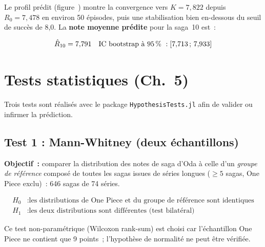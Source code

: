 \documentclass[a4paper,12pt,french]{article}
\newcommand{\code}[1]{\texttt{#1}}
\begin{document}
Le profil prédit (figure~) montre la convergence vers $K = 7{,}822$
depuis $R_0 = 7{,}478$ en environ 50 épisodes, puis une stabilisation bien
en-dessous du seuil de succès de 8{,}0. La \textbf{note moyenne prédite} pour la
saga~10 est~:

\begin{equation}
  \hat{R}_{10} = 7{,}791 \quad
  \text{IC bootstrap à 95\,\%}~: \left[7{,}713\,;\, 7{,}933\right]
\end{equation}

\newpage
\section{Tests statistiques (Ch.~5)}

Trois tests sont réalisés avec le package \code{HypothesisTests.jl} afin de
valider ou infirmer la prédiction.

\subsection{Test 1 : Mann-Whitney (deux échantillons)}

\textbf{Objectif~:} comparer la distribution des notes de saga d'Oda à celle
d'un \textit{groupe de référence} composé de toutes les sagas issues de séries
longues ($\geq 5$ sagas, One Piece exclu)~: 646 sagas de 74 séries.

\begin{align*}
  H_0 &: \text{les distributions de One Piece et du groupe de référence sont identiques} \\
  H_1 &: \text{les deux distributions sont différentes (test bilatéral)}
\end{align*}

Ce test non-paramétrique (Wilcoxon rank-sum) est choisi car l'échantillon
One Piece ne contient que 9 points~; l'hypothèse de normalité ne peut être
vérifiée.
\end{document}
